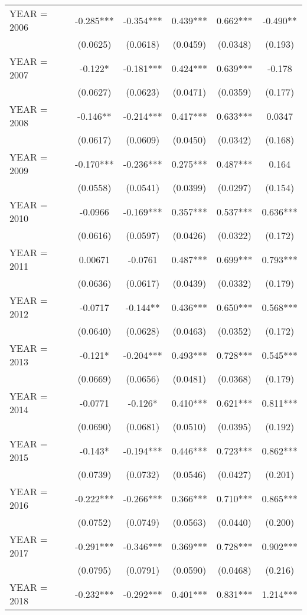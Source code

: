 \begin{tabular}{lccccc}
YEAR = 2006 & -0.285*** & -0.354*** & 0.439*** & 0.662*** & -0.490** \\
 & (0.0625) & (0.0618) & (0.0459) & (0.0348) & (0.193) \\
YEAR = 2007 & -0.122* & -0.181*** & 0.424*** & 0.639*** & -0.178 \\
 & (0.0627) & (0.0623) & (0.0471) & (0.0359) & (0.177) \\
YEAR = 2008 & -0.146** & -0.214*** & 0.417*** & 0.633*** & 0.0347 \\
 & (0.0617) & (0.0609) & (0.0450) & (0.0342) & (0.168) \\
YEAR = 2009 & -0.170*** & -0.236*** & 0.275*** & 0.487*** & 0.164 \\
 & (0.0558) & (0.0541) & (0.0399) & (0.0297) & (0.154) \\
YEAR = 2010 & -0.0966 & -0.169*** & 0.357*** & 0.537*** & 0.636*** \\
 & (0.0616) & (0.0597) & (0.0426) & (0.0322) & (0.172) \\
YEAR = 2011 & 0.00671 & -0.0761 & 0.487*** & 0.699*** & 0.793*** \\
 & (0.0636) & (0.0617) & (0.0439) & (0.0332) & (0.179) \\
YEAR = 2012 & -0.0717 & -0.144** & 0.436*** & 0.650*** & 0.568*** \\
 & (0.0640) & (0.0628) & (0.0463) & (0.0352) & (0.172) \\
YEAR = 2013 & -0.121* & -0.204*** & 0.493*** & 0.728*** & 0.545*** \\
 & (0.0669) & (0.0656) & (0.0481) & (0.0368) & (0.179) \\
YEAR = 2014 & -0.0771 & -0.126* & 0.410*** & 0.621*** & 0.811*** \\
 & (0.0690) & (0.0681) & (0.0510) & (0.0395) & (0.192) \\
YEAR = 2015 & -0.143* & -0.194*** & 0.446*** & 0.723*** & 0.862*** \\
 & (0.0739) & (0.0732) & (0.0546) & (0.0427) & (0.201) \\
YEAR = 2016 & -0.222*** & -0.266*** & 0.366*** & 0.710*** & 0.865*** \\
 & (0.0752) & (0.0749) & (0.0563) & (0.0440) & (0.200) \\
YEAR = 2017 & -0.291*** & -0.346*** & 0.369*** & 0.728*** & 0.902*** \\
 & (0.0795) & (0.0791) & (0.0590) & (0.0468) & (0.216) \\
YEAR = 2018 & -0.232*** & -0.292*** & 0.401*** & 0.831*** & 1.214*** \\

\end{tabular}
